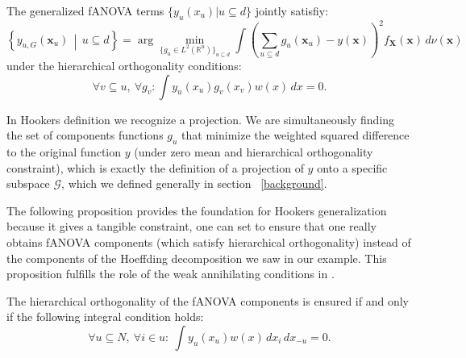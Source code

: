 The generalized fANOVA terms $\{y_u(x_u) | u \subseteq d \}$ jointly satisfiy:
\begin{equation}
\left\{ y_{u, G}(\boldsymbol{x}_u) \,\middle|\, u \subseteq d \right\}
= \arg\min_{\{g_u \in L^2(\mathbb{R}^u)\}_{u \subseteq d}} 
\int \left( \sum_{u \subseteq d} g_u(\boldsymbol{x}_u) - y(\boldsymbol{x}) \right)^2 f_{\boldsymbol{X}}(\boldsymbol{x}) \, d \nu (\boldsymbol{x})
\label{eq:generalized_fanova_components_hooker}
\end{equation}
under the hierarchical orthogonality conditions:
\begin{equation}
    \forall v \subseteq u,\ \forall g_v : \int y_u(x_u) g_v(x_v) w(x) \, dx = 0. \tag{4.2}
\label{eq:hooker_hierarchical_orthogonality}
\end{equation}

In Hookers definition we recognize a projection. We are simultaneously finding the set of components functions $g_u$ that minimize the weighted squared difference to the original function $y$ (under zero mean and hierarchical orthogonality constraint), which is exactly the definition of a projection of $y$ onto a specific subspace $\mathcal{G}$, which we defined generally in section ~\ref{background}.\par

The following proposition provides the foundation for Hookers generalization because it gives a tangible constraint, one can set to ensure that one really obtains fANOVA components (which satisfy hierarchical orthogonality) instead of the components of the Hoeffding decomposition we saw in our example. This proposition fulfills the role of the weak annihilating conditions in \cite{rahman2014}.
\begin{proposition}
    The hierarchical orthogonality of the fANOVA components is ensured if and only if the following integral condition holds:
    \begin{equation}
\forall u \subseteq N,\ \forall i \in u:\ \int y_u(x_u) w(x)\, dx_i\, dx_{-u} = 0.
\tag{4.3}
\end{equation}
\label{proposition:hooker_hierarchical_orthogonality}
\end{proposition}

